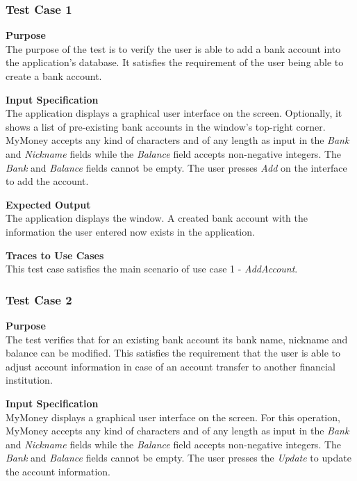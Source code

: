 \documentclass[12pt]{article}
\begin{document}
\subsubsection{Test Case 1} \label{TC-1}

\noindent
{\bf Purpose}\\
The purpose of the test is to verify the user is able to add a bank account into the application's database.
It satisfies the requirement of the user being able to create a bank account.

\noindent
    {\bf Input Specification}\\
    The application displays a graphical user interface on the screen.
    Optionally, it shows a list of pre-existing bank accounts in the window's top-right corner.
    MyMoney accepts any kind of characters and of any length as input in the \textit{Bank} and \textit{Nickname} fields while
    the \textit{Balance} field accepts non-negative integers. The \textit{Bank} and \textit{Balance} fields cannot be empty.
    The user presses \textit{Add} on the interface to add the account.
    
\noindent
    {\bf Expected Output}\\
    The application displays the window.
    A created bank account with the information the user entered now exists in the application.
    
\noindent
    {\bf Traces to Use Cases}\\
    This test case satisfies the main scenario of use case 1 - \textit{AddAccount}.

\subsubsection{Test Case 2} \label{TC-2}
\noindent
{\bf Purpose}\\
        The test verifies that for an existing bank account its bank name, nickname and balance can be modified.
        This satisfies the requirement that the user is able to adjust account information in case of an account transfer
        to another financial institution. 

\noindent
{\bf Input Specification}\\
            MyMoney displays a graphical user interface on the screen.
            For this operation, MyMoney accepts any kind of characters and of any length as
            input in the \textit{Bank} and \textit{Nickname} fields while the \textit{Balance} field accepts non-negative integers.
            The \textit{Bank} and \textit{Balance} fields cannot be empty. The user presses the \textit{Update} to update the account information.
            
\end{document}
